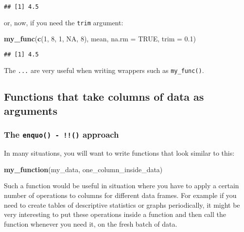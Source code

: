 \documentclass[
]{article}
\newenvironment{Shaded}{\begin{snugshade}}{\end{snugshade}}
\newcommand{\DataTypeTok}[1]{\textcolor[rgb]{0.13,0.29,0.53}{#1}}
\newcommand{\DecValTok}[1]{\textcolor[rgb]{0.00,0.00,0.81}{#1}}
\newcommand{\FloatTok}[1]{\textcolor[rgb]{0.00,0.00,0.81}{#1}}
\newcommand{\KeywordTok}[1]{\textcolor[rgb]{0.13,0.29,0.53}{\textbf{#1}}}
\newcommand{\NormalTok}[1]{#1}
\newcommand{\OtherTok}[1]{\textcolor[rgb]{0.56,0.35,0.01}{#1}}
\begin{document}
\begin{verbatim}
## [1] 4.5
\end{verbatim}

or, now, if you need the \texttt{trim} argument:

\begin{Shaded}
\begin{Highlighting}[]
\KeywordTok{my\_func}\NormalTok{(}\KeywordTok{c}\NormalTok{(}\DecValTok{1}\NormalTok{, }\DecValTok{8}\NormalTok{, }\DecValTok{1}\NormalTok{, }\OtherTok{NA}\NormalTok{, }\DecValTok{8}\NormalTok{), mean, }\DataTypeTok{na.rm =} \OtherTok{TRUE}\NormalTok{, }\DataTypeTok{trim =} \FloatTok{0.1}\NormalTok{)}
\end{Highlighting}
\end{Shaded}

\begin{verbatim}
## [1] 4.5
\end{verbatim}

The \texttt{...} are very useful when writing wrappers such as \texttt{my\_func()}.

\hypertarget{functions-that-take-columns-of-data-as-arguments}{%
\subsection{Functions that take columns of data as arguments}\label{functions-that-take-columns-of-data-as-arguments}}

\hypertarget{the-enquo---approach}{%
\subsubsection{\texorpdfstring{The \texttt{enquo()\ -\ !!()} approach}{The enquo() - !!() approach}}\label{the-enquo---approach}}

In many situations, you will want to write functions that look similar to this:

\begin{Shaded}
\begin{Highlighting}[]
\KeywordTok{my\_function}\NormalTok{(my\_data, one\_column\_inside\_data)}
\end{Highlighting}
\end{Shaded}

Such a function would be useful in situation where you have to apply a certain number of operations
to columns for different data frames. For example if you need to create tables of descriptive
statistics or graphs periodically, it might be very interesting to put these operations inside a
function and then call the function whenever you need it, on the fresh batch of data.
\end{document}
